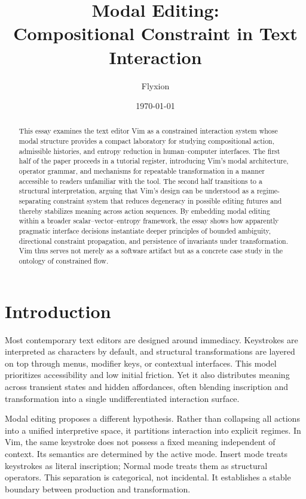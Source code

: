 \documentclass[12pt]{article}
\title{Modal Editing:\\
Compositional Constraint in Text Interaction}
\author{Flyxion}
\date{\today}
\begin{document}
\maketitle

\begin{abstract}

This essay examines the text editor Vim as a constrained interaction system whose modal structure provides a compact laboratory for studying compositional action, admissible histories, and entropy reduction in human–computer interfaces. The first half of the paper proceeds in a tutorial register, introducing Vim’s modal architecture, operator grammar, and mechanisms for repeatable transformation in a manner accessible to readers unfamiliar with the tool. The second half transitions to a structural interpretation, arguing that Vim’s design can be understood as a regime-separating constraint system that reduces degeneracy in possible editing futures and thereby stabilizes meaning across action sequences. By embedding modal editing within a broader scalar–vector–entropy framework, the essay shows how apparently pragmatic interface decisions instantiate deeper principles of bounded ambiguity, directional constraint propagation, and persistence of invariants under transformation. Vim thus serves not merely as a software artifact but as a concrete case study in the ontology of constrained flow.

\end{abstract}

\newpage
\section{Introduction}

Most contemporary text editors are designed around immediacy. Keystrokes are interpreted as characters by default, and structural transformations are layered on top through menus, modifier keys, or contextual interfaces. This model prioritizes accessibility and low initial friction. Yet it also distributes meaning across transient states and hidden affordances, often blending inscription and transformation into a single undifferentiated interaction surface.

Modal editing proposes a different hypothesis. Rather than collapsing all actions into a unified interpretive space, it partitions interaction into explicit regimes. In Vim, the same keystroke does not possess a fixed meaning independent of context. Its semantics are determined by the active mode. Insert mode treats keystrokes as literal inscription; Normal mode treats them as structural operators. This separation is categorical, not incidental. It establishes a stable boundary between production and transformation.
\end{document}
